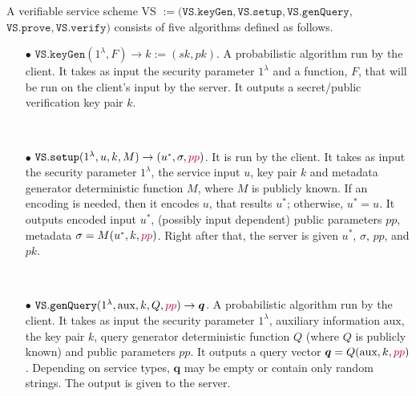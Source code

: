 \begin{definition}[VS Scheme]\label{service-def}
A verifiable service scheme VS $:=(\mathtt{VS.keyGen}, \mathtt{VS.setup},\mathtt{VS.genQuery},$ $\mathtt{VS.prove},\mathtt{VS.verify})$ consists of five algorithms defined as follows.


\begin{itemize}

\item[$\bullet$] $\mathtt{VS.keyGen}(1^{\lambda},F)\rightarrow k:=(sk,pk)$.  A probabilistic algorithm run by the client. It takes as input the security parameter $1^{\lambda}$ and a function, $F$, that will be run on the client's input by the server. It outputs a secret/public verification key pair $k$. 


\

\item[$\bullet$] $\mathtt{VS.setup}(1^{\lambda}, u,k, M)\rightarrow (u^{\scriptscriptstyle *},\sigma,{\color{purple}pp})$. It is run by the client. It takes as input the security parameter $1^{\lambda}$,  the service input $u$,    key pair $k$ and metadata generator deterministic function $M$, where $M$ is publicly known. If an encoding is needed, then it encodes $u$, that results $u^{\scriptscriptstyle *}$; otherwise, $u^*=u$. It outputs encoded input $u^{\scriptscriptstyle *}$, (possibly input dependent) public parameters {\color{purple}$pp$}, metadata $\sigma=M(u^{\scriptscriptstyle *},k,{\color{purple}pp})$. Right after that, the server is  given $u^{\scriptscriptstyle *}$,  $\sigma$, {\color{purple}$pp$}, and $pk$. %



\

\item[$\bullet$] $\mathtt{VS.genQuery}(1^{\lambda}, \text{aux},k,Q,{\color{purple}pp})\rightarrow \bm{q}$. A probabilistic algorithm run by the client. It takes as input the security parameter $1^{\lambda}$, auxiliary information $\text{aux}$,   the key pair $k$,   query generator deterministic function $Q$ (where $Q$ is publicly known) and {\color{purple}public parameters $pp$}. It outputs  a query vector $\bm{q}=Q( \text{aux},k,{\color{purple}pp})$.  Depending on service types, $\bm{q}$ may be empty or contain only random strings. The output  is given to the server. 


\end{itemize}
\end{definition}
